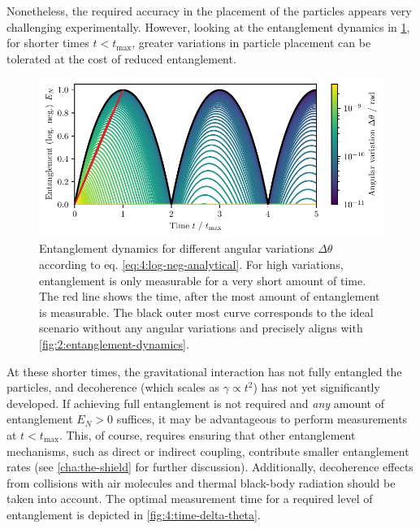 Nonetheless, the required accuracy in the placement of the particles appears very challenging experimentally.
However, looking at the entanglement dynamics in \cref{fig:4:EN-dynamics-variations}, for shorter times $t<t_\mathrm{max}$, greater variations in particle placement can be tolerated at the cost of reduced entanglement.
\begin{figure}[!htbp]
  \centering
  \includegraphics[width=\textwidth]{./../figures/theta-variance/EN-dynamics-delta-theta.pdf}
  \caption{Entanglement dynamics for different angular variations $\Delta \theta$ according to eq. \eqref{eq:4:log-neg-analytical}. For high variations, entanglement is only measurable for a very short amount of time. The red line shows the time, after the most amount of entanglement is measurable. The black outer most curve corresponds to the ideal scenario without any angular variations and precisely aligns with \cref{fig:2:entanglement-dynamics}.}
  \label{fig:4:EN-dynamics-variations}
\end{figure}
At these shorter times, the gravitational interaction has not fully entangled the particles, and decoherence (which scales as $\gamma \propto t^2$) has not yet significantly developed.
If achieving full entanglement is not required and \textit{any} amount of entanglement $E_N > 0$ suffices, it may be advantageous to perform measurements at $t < t_\mathrm{max}$.
This, of course, requires ensuring that other entanglement mechanisms, such as direct or indirect coupling, contribute smaller entanglement rates (see \cref{cha:the-shield} for further discussion).
Additionally, decoherence effects from collisions with air molecules and thermal black-body radiation should be taken into account.
The optimal measurement time for a required level of entanglement is depicted in \cref{fig:4:time-delta-theta}.
